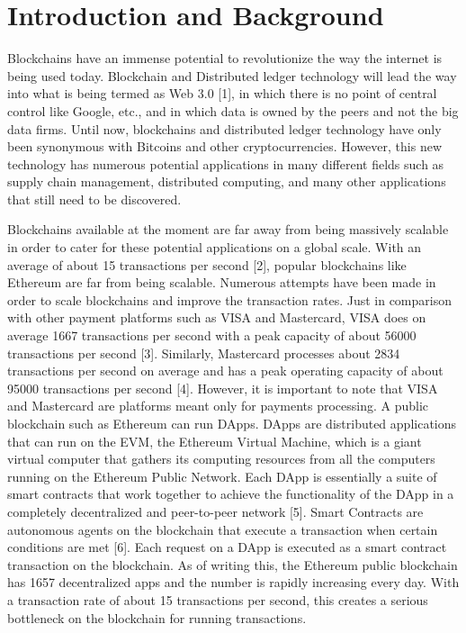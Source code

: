 \documentclass[a4paper,twoside,phd]{BYUPhys}
\begin{document}
\section{Introduction and Background}
Blockchains have an immense potential to revolutionize the way the internet is being used today. Blockchain and Distributed ledger technology will lead the way into what is being termed as Web 3.0 [1], in which there is no point of central control like Google, etc., and in which data is owned by the peers and not the big data firms. Until now, blockchains and distributed ledger technology have only been synonymous with Bitcoins and other cryptocurrencies. However, this new technology has numerous potential applications in many different fields such as supply chain management, distributed computing, and many other applications that still need to be discovered. \par
Blockchains available at the moment are far away from being massively scalable in order to cater for these potential applications on a global scale. With an average of about 15 transactions per second [2], popular blockchains like Ethereum are far from being scalable. Numerous attempts have been made in order to scale blockchains and improve the transaction rates. Just in comparison with other payment platforms such as VISA and Mastercard, VISA does on average 1667 transactions per second with a peak capacity of about 56000 transactions per second [3]. Similarly, Mastercard processes about 2834 transactions per second on average and has a peak operating capacity of about 95000 transactions per second [4]. However, it is important to note that VISA and Mastercard are platforms meant only for payments processing. A public blockchain such as Ethereum can run DApps. DApps are distributed applications that can run on the EVM, the Ethereum Virtual Machine, which is a giant virtual computer that gathers its computing resources from all the computers running on the Ethereum Public Network. Each DApp is essentially a suite of smart contracts that work together to achieve the functionality of the DApp in a completely decentralized and peer-to-peer network [5]. Smart Contracts are autonomous agents on the blockchain that execute a transaction when certain conditions are met [6]. Each request on a DApp is executed as a smart contract transaction on the blockchain. As of writing this, the Ethereum public blockchain has 1657 decentralized apps and the number is rapidly increasing every day. With a transaction rate of about 15 transactions per second, this creates a serious bottleneck on the blockchain for running transactions. \par
\end{document}
